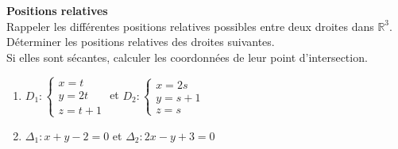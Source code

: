 \documentclass[10pt,a4paper]{article}
\begin{document}
\textbf{Positions relatives}\\

Rappeler les différentes positions relatives possibles entre deux droites dans $\mathbb{R}^3$.\\

Déterminer les positions relatives des droites suivantes.\\
Si elles sont sécantes, calculer les coordonnées de leur point d'intersection.

\begin{enumerate}
    \item $D_1 : \begin{cases} x = t \\ y = 2t \\ z = t+1 \end{cases}$ et
           $D_2 : \begin{cases} x = 2s \\ y = s+1 \\ z = s \end{cases}$
    \item $\Delta_1 : x + y - 2 = 0$ et $\Delta_2 : 2x - y + 3 = 0$
\end{enumerate}
\end{document}
